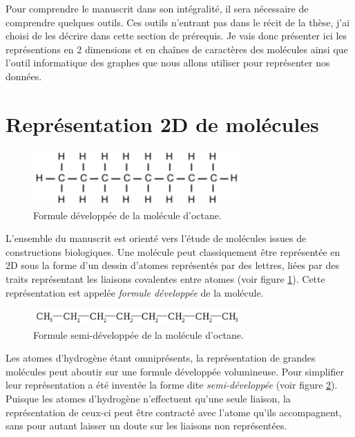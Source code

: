 Pour comprendre le manuscrit dans son intégralité, il sera nécessaire de comprendre quelques outils.
Ces outils n'entrant pas dans le récit de la thèse, j'ai choisi de les décrire dans cette section de prérequis.
Je vais donc présenter ici les représentions en 2 dimensions et en chaînes de caractères des molécules ainsi que l'outil informatique des graphes que nous allons utiliser pour représenter nos données.

\section{Représentation 2D de molécules}

\begin{figure}[h!]
  \begin{center}
    \includegraphics[width=300px]{Figures/Prerequis/developpee.png}
    \caption{\label{dev}Formule développée de la molécule d'octane.}
  \end{center}
\end{figure}

L'ensemble du manuscrit est orienté vers l'étude de molécules issues de constructions biologiques.
Une molécule peut classiquement être représentée en 2D sous la forme d'un dessin d'atomes représentés par des lettres, liées par des traits représentant les liaisons covalentes entre atomes (voir figure \ref{dev}).
Cette représentation est appelée \textit{formule développée} de la molécule.

\begin{figure}[h!]
  \begin{center}
    \includegraphics[width=300px]{Figures/Prerequis/semi.png}
    \caption{\label{semi}Formule semi-développée de la molécule d'octane.}
  \end{center}
\end{figure}

Les atomes d'hydrogène étant omniprésents, la représentation de grandes molécules peut aboutir sur une formule développée volumineuse.
Pour simplifier leur représentation a été inventée la forme dite \textit{semi-développée} (voir figure \ref{semi}).
Puisque les atomes d'hydrogène n'effectuent qu'une seule liaison, la représentation de ceux-ci peut être contracté avec l'atome qu'ils accompagnent, sans pour autant laisser un doute sur les liaisons non représentées.


